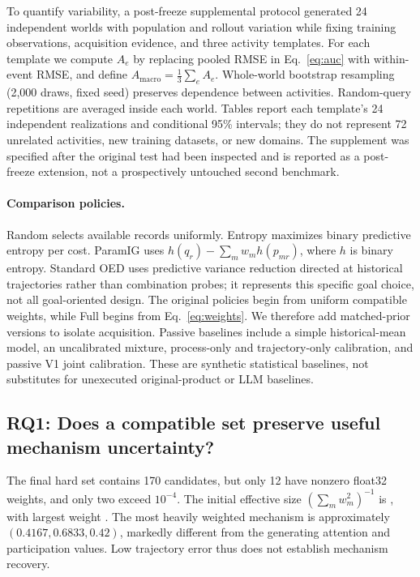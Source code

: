 To quantify variability, a post-freeze supplemental protocol generated 24 independent worlds with population and rollout variation while fixing training observations, acquisition evidence, and three activity templates. For each template we compute $A_e$ by replacing pooled RMSE in Eq.~\eqref{eq:auc} with within-event RMSE, and define $A_{\mathrm{macro}}=\frac13\sum_e A_e$. Whole-world bootstrap resampling (2,000 draws, fixed seed) preserves dependence between activities. Random-query repetitions are averaged inside each world. Tables report each template's 24 independent realizations and conditional 95\% intervals; they do not represent 72 unrelated activities, new training datasets, or new domains. The supplement was specified after the original test had been inspected and is reported as a post-freeze extension, not a prospectively untouched second benchmark.

\paragraph{Comparison policies.}
Random selects available records uniformly. Entropy maximizes binary predictive entropy per cost. ParamIG uses $h(q_r)-\sum_mw_mh(p_{mr})$, where $h$ is binary entropy. Standard OED uses predictive variance reduction directed at historical trajectories rather than combination probes; it represents this specific goal choice, not all goal-oriented design. The original policies begin from uniform compatible weights, while Full begins from Eq.~\eqref{eq:weights}. We therefore add matched-prior versions to isolate acquisition. Passive baselines include a simple historical-mean model, an uncalibrated mixture, process-only and trajectory-only calibration, and passive V1 joint calibration. These are synthetic statistical baselines, not substitutes for unexecuted original-product or LLM baselines.

\subsection{RQ1: Does a compatible set preserve useful mechanism uncertainty?}
The final hard set contains 170 candidates, but only 12 have nonzero float32 weights, and only two exceed $10^{-4}$. The initial effective size $(\sum_mw_m^2)^{-1}$ is \ESS, with largest weight \MaxWeight. The most heavily weighted mechanism is approximately $(0.4167,0.6833,0.42)$, markedly different from the generating attention and participation values. Low trajectory error thus does not establish mechanism recovery.

